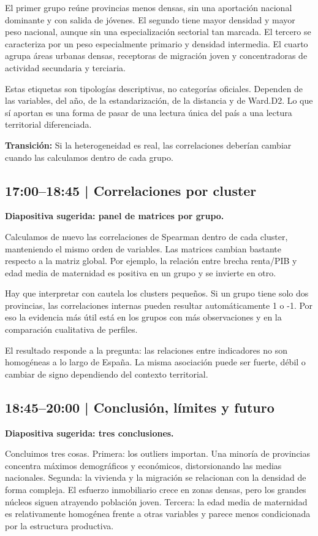 \documentclass[11pt,a4paper]{article}
\begin{document}
El primer grupo reúne provincias menos densas, sin una aportación nacional dominante y con salida de jóvenes. El segundo tiene mayor densidad y mayor peso nacional, aunque sin una especialización sectorial tan marcada. El tercero se caracteriza por un peso especialmente primario y densidad intermedia. El cuarto agrupa áreas urbanas densas, receptoras de migración joven y concentradoras de actividad secundaria y terciaria.

Estas etiquetas son tipologías descriptivas, no categorías oficiales. Dependen de las variables, del año, de la estandarización, de la distancia y de Ward.D2. Lo que sí aportan es una forma de pasar de una lectura única del país a una lectura territorial diferenciada.

\textbf{Transición:} Si la heterogeneidad es real, las correlaciones deberían cambiar cuando las calculamos dentro de cada grupo.

\subsection{17:00--18:45 | Correlaciones por cluster}
\textbf{Diapositiva sugerida: panel de matrices por grupo.}

Calculamos de nuevo las correlaciones de Spearman dentro de cada cluster, manteniendo el mismo orden de variables. Las matrices cambian bastante respecto a la matriz global. Por ejemplo, la relación entre brecha renta/PIB y edad media de maternidad es positiva en un grupo y se invierte en otro.

Hay que interpretar con cautela los clusters pequeños. Si un grupo tiene solo dos provincias, las correlaciones internas pueden resultar automáticamente 1 o -1. Por eso la evidencia más útil está en los grupos con más observaciones y en la comparación cualitativa de perfiles.

El resultado responde a la pregunta: las relaciones entre indicadores no son homogéneas a lo largo de España. La misma asociación puede ser fuerte, débil o cambiar de signo dependiendo del contexto territorial.

\subsection{18:45--20:00 | Conclusión, límites y futuro}
\textbf{Diapositiva sugerida: tres conclusiones.}

Concluimos tres cosas. Primera: los outliers importan. Una minoría de provincias concentra máximos demográficos y económicos, distorsionando las medias nacionales. Segunda: la vivienda y la migración se relacionan con la densidad de forma compleja. El esfuerzo inmobiliario crece en zonas densas, pero los grandes núcleos siguen atrayendo población joven. Tercera: la edad media de maternidad es relativamente homogénea frente a otras variables y parece menos condicionada por la estructura productiva.
\end{document}
